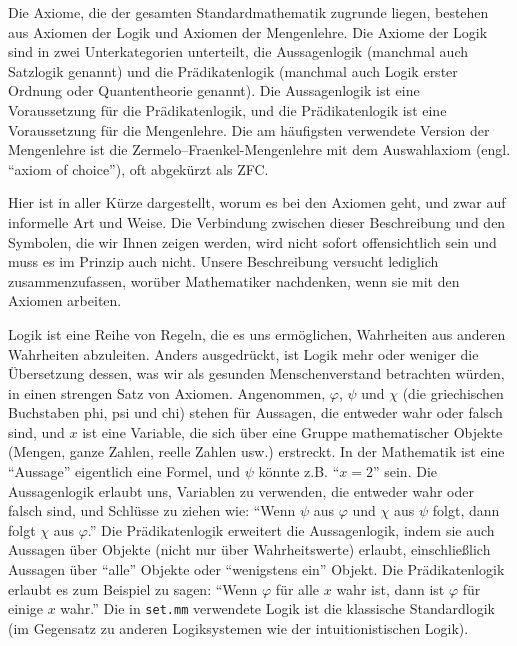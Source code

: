 Die Axiome, die der gesamten Standardmathematik zugrunde liegen, bestehen aus Axiomen der Logik und Axiomen der Mengenlehre. Die Axiome der Logik sind in zwei Unterkategorien unterteilt, die Aussagenlogik (manchmal auch Satzlogik genannt) und die Prädikatenlogik (manchmal auch Logik erster Ordnung oder Quantentheorie genannt).  Die Aussagenlogik ist eine Voraussetzung für die Prädikatenlogik, und die Prädikatenlogik ist eine Voraussetzung für die Mengenlehre.  Die am häufigsten verwendete Version der Mengenlehre ist die Zermelo--Fraenkel-Mengenlehre mit dem Auswahlaxiom (engl. "`axiom of choice"'), oft abgekürzt als ZFC.

Hier ist in aller Kürze dargestellt, worum es bei den Axiomen geht, und zwar auf informelle Art und Weise. Die Verbindung zwischen dieser Beschreibung und den Symbolen, die wir Ihnen zeigen werden, wird nicht sofort offensichtlich sein und muss es im Prinzip auch nicht.  Unsere Beschreibung versucht lediglich zusammenzufassen, worüber Mathematiker nachdenken, wenn sie mit den Axiomen arbeiten.

Logik ist eine Reihe von Regeln, die es uns ermöglichen, Wahrheiten aus anderen Wahrheiten abzuleiten. Anders ausgedrückt, ist Logik mehr oder weniger die Übersetzung dessen, was wir als gesunden Menschenverstand betrachten würden, in einen strengen Satz von Axiomen.  Angenommen, $\varphi$, $\psi$ und $\chi$ (die griechischen Buchstaben phi, psi und chi) stehen für Aussagen, die entweder wahr oder falsch sind, und $x$ ist eine Variable, die sich über eine Gruppe mathematischer Objekte (Mengen, ganze Zahlen, reelle Zahlen usw.) erstreckt. In der Mathematik ist eine "`Aussage"' eigentlich eine Formel, und $\psi$ könnte z.B. "`$x = 2$"' sein. Die Aussagenlogik erlaubt uns, Variablen zu verwenden, die entweder wahr oder falsch sind, und Schlüsse zu ziehen wie:
"`Wenn $\psi$ aus $\varphi$ und $\chi$  aus $\psi$ folgt, dann folgt $\chi$ aus $\varphi$."' Die Prädikatenlogik erweitert die Aussagenlogik, indem sie auch Aussagen über Objekte (nicht nur über Wahrheitswerte) erlaubt, einschließlich Aussagen über "`alle"' Objekte oder "`wenigstens ein"' Objekt. Die Prädikatenlogik erlaubt es zum Beispiel zu sagen: "`Wenn $\varphi$ für alle $x$ wahr ist, dann ist $\varphi$ für einige $x$ wahr."' Die in \texttt{set.mm} verwendete Logik ist die klassische Standardlogik (im Gegensatz zu anderen Logiksystemen wie der intuitionistischen Logik).

